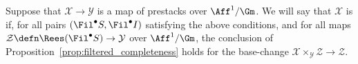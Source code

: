 \documentclass[10pt]{amsart}
\begin{document}
\begin{definition}
\label{defn:filtered_integrable}
Suppose that $\mathcal{X}\to \mathcal{Y}$ is a map of prestacks over $\Aff^1/\Gm$. We will say that $\mathcal{X}$ is  if, for all pairs $(\Fil^\bullet S,\Fil^\bullet I)$ satisfying the above conditions, and for all maps $\mathcal{Z}\defn \Rees(\Fil^\bullet S)\to \mathcal{Y}$ over $\Aff^1/\Gm$, the conclusion of Proposition~\ref{prop:filtered_completeness} holds for the base-change $\mathcal{X}\times_{\mathcal{Y}}\mathcal{Z}\to \mathcal{Z}$.
\end{definition} 

\printbibliography
\end{document}
